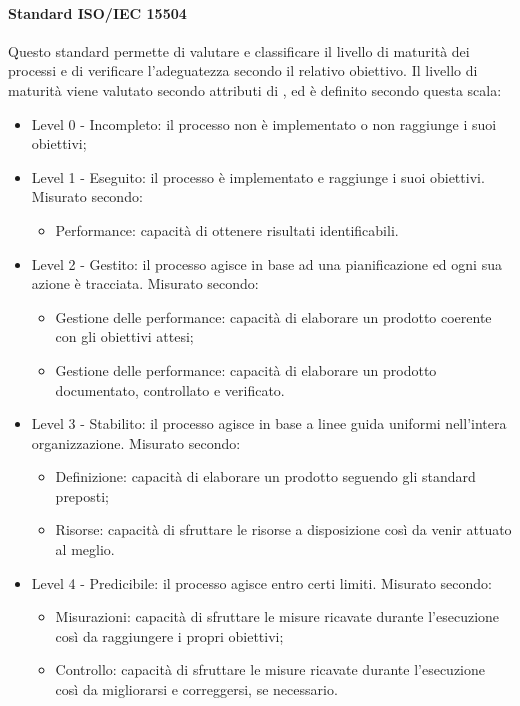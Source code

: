 \documentclass[../NormeDiProgetto_v3.0.0.tex]{subfiles}
\begin{document}
			\paragraph{Standard ISO/IEC 15504}
				Questo standard permette di valutare e classificare il livello di maturità dei processi e di verificare l'adeguatezza secondo il relativo obiettivo. Il livello di maturità viene valutato secondo attributi di , ed è definito secondo questa scala:
				\begin{itemize}
					\item Level 0 - Incompleto: il processo non è implementato o non raggiunge i suoi obiettivi;
					\item Level 1 - Eseguito: il processo è implementato e raggiunge i suoi obiettivi.
					Misurato secondo:
						\begin{itemize}
							\item Performance: capacità di ottenere risultati identificabili.
						\end{itemize}
					\item Level 2 - Gestito: il processo agisce in base ad una pianificazione ed ogni sua azione è tracciata.
					Misurato secondo:
						\begin{itemize}
							\item Gestione delle performance: capacità di elaborare un prodotto coerente con gli obiettivi attesi;
							\item Gestione delle performance: capacità di elaborare un prodotto documentato, controllato e verificato.
						\end{itemize}
					\item Level 3 - Stabilito: il processo agisce in base a linee guida uniformi nell'intera organizzazione.
					Misurato secondo:
						\begin{itemize}
							\item Definizione: capacità di elaborare un prodotto seguendo gli standard preposti;
							\item Risorse: capacità di sfruttare le risorse a disposizione così da venir attuato al meglio.
						\end{itemize}
					\item Level 4 - Predicibile: il processo agisce entro certi limiti.
					Misurato secondo:
						\begin{itemize}
							\item Misurazioni: capacità di sfruttare le misure ricavate durante l'esecuzione così da raggiungere i propri obiettivi;
							\item Controllo: capacità di sfruttare le misure ricavate durante l'esecuzione così da migliorarsi e correggersi, se necessario.

\end{itemize}
\end{itemize}
\end{document}
